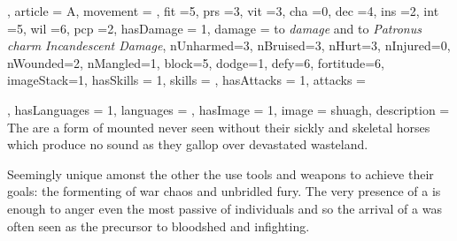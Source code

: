 {{

, article = A, movement = , fit =5, prs =3, vit =3, cha =0, dec =4, ins =2, int =5, wil =6, pcp =2, hasDamage = 1, damage = to \textit{ damage} and  to \textit{Patronus charm\comma{} Incandescent Damage}, nUnharmed=3, nBruised=3, nHurt=3, nInjured=0, nWounded=2, nMangled=1, block=5, dodge=1, defy=6, fortitude=6, imageStack=1, hasSkills = 1, skills = 
, hasAttacks = 1, attacks = 

, hasLanguages = 1, languages = , hasImage = 1, image = shuagh, description = The \name{} are a form of mounted \comma{} never seen without their sickly and skeletal horses\comma{} which produce no sound as they gallop over devastated wasteland. 

Seemingly unique amonst the other \comma{} the \name{} use tools and weapons to achieve their goals: the formenting of war\comma{} chaos and unbridled fury. The very presence of a \name{} is enough to anger even the most passive of individuals\comma{} and so the arrival of a \name{} was often seen as the precursor to bloodshed and infighting.}

}








